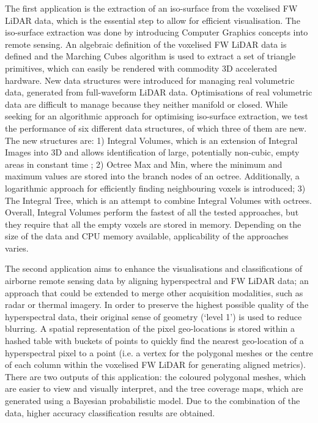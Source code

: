 \documentclass{subfiles}
\begin{document}
\par The first application is the extraction of an iso-surface from the voxelised FW LiDAR data, which is the essential step to allow for efficient visualisation. The iso-surface extraction was done by introducing Computer Graphics concepts into remote sensing. An algebraic definition of the voxelised FW LiDAR data is defined and the Marching Cubes algorithm is used to extract a set of triangle primitives, which can easily be rendered with commodity 3D accelerated hardware. New data structures were introduced for managing real volumetric data, generated from full-waveform LiDAR data. Optimisations of real volumetric data are difficult to manage because they neither manifold or closed. While seeking for an algorithmic approach for optimising iso-surface extraction, we test the performance of six different data structures, of which three of them are new. The new structures are: 1) Integral Volumes, which is an extension of Integral Images into 3D and allows identification of large, potentially non-cubic, empty areas in constant time ; 2) Octree Max and Min, where the minimum and maximum values are stored into the branch nodes of an octree. Additionally, a logarithmic approach for efficiently finding neighbouring voxels is introduced; 3) The Integral Tree, which is an attempt to combine Integral Volumes with octrees. Overall, Integral Volumes perform the fastest of all the tested approaches, but they require that all the empty voxels are stored in memory. Depending on the size of the data and CPU memory available, applicability of the approaches varies.

\par The second application aims to enhance the visualisations and classifications of airborne remote sensing data by aligning hyperspectral and FW LiDAR data; an approach that could be extended to merge other acquisition modalities, such as radar or thermal imagery.  In order to preserve the highest possible quality of the hyperspectral data, their original sense of geometry (`level 1') is used to reduce blurring. A spatial representation of the pixel geo-locations is stored within a hashed table with buckets of points to quickly find the nearest geo-location of a hyperspectral pixel to a point (i.e. a vertex for the polygonal meshes or the centre of each column within the voxelised FW LiDAR for generating aligned metrics). There are two outputs of this application: the coloured polygonal meshes, which are easier to view and visually interpret, and the tree coverage maps, which are generated using a Bayesian probabilistic model.  Due to the combination of the data, higher accuracy classification results are obtained.
\end{document}

